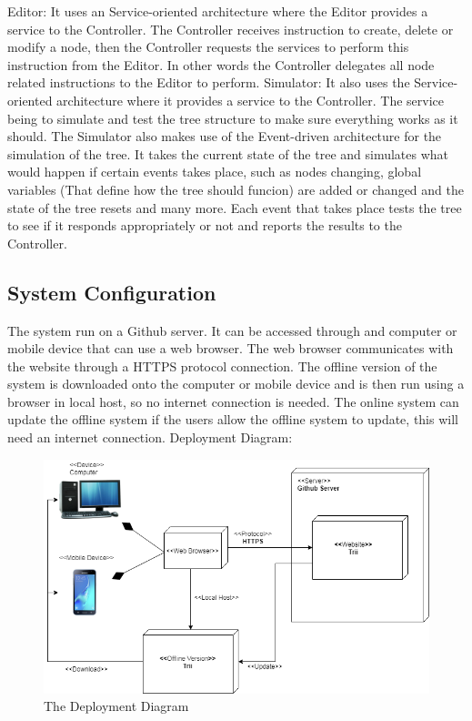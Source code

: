 \documentclass[12pt]{article}
\begin{document}
    Editor: It uses an Service-oriented architecture where the Editor provides a service to the Controller. The Controller receives instruction to create, delete or modify a node, then the Controller requests the services to perform this instruction from the Editor. In other words the Controller delegates all node related instructions to the Editor to perform.\newline \newline 
    Simulator: It also uses the Service-oriented architecture where it provides a service to the Controller. The service being to simulate and test the tree structure to make sure everything works as it should. The Simulator also makes use of the Event-driven architecture for the simulation of the tree. It takes the current state of the tree and simulates what would happen if certain events takes place, such as nodes changing, global variables (That define how the tree should funcion) are added or changed and the state of the tree resets and many more. Each event that takes place tests the tree to see if it responds appropriately or not and reports the results to the Controller.

  \subsection{System Configuration} 
    The system run on a Github server. It can be accessed through and computer or mobile device that can use a web browser. The web browser communicates with the website through a HTTPS protocol connection. The offline version of the system is downloaded onto the computer or mobile device and is then run using a browser in local host, so no internet connection is needed. The online system can update the offline system if the users allow the offline system to update, this will need an internet connection.\newline \newline 
    Deployment Diagram:
    
    \begin{figure}[H]
      \includegraphics[width=\linewidth]{TriiDeploymentDiagram}
      \caption{The Deployment Diagram}
      \label{fig:deploymentdiagram}
    \end{figure}
\end{document}
